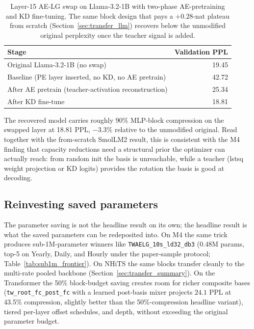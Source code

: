\documentclass[11pt,a4paper]{article}
\begin{document}
\begin{table}[h]
  \caption{Layer-15 AE-LG swap on Llama-3.2-1B with two-phase AE-pretraining and KD fine-tuning. The same block design that pays a $+0.28$-nat plateau from scratch (Section~\ref{sec:transfer_llm}) recovers below the unmodified original perplexity once the teacher signal is added.}
  \label{tab:llm_kd}
  \centering
  \begin{tabular}{lr}
    \toprule
    Stage & Validation PPL \\
    \midrule
    Original Llama-3.2-1B (no swap)                 & 19.45 \\
    Baseline (PE layer inserted, no KD, no AE pretrain) & 42.72 \\
    After AE pretrain (teacher-activation reconstruction) & 25.34 \\
    After KD fine-tune                              & 18.81 \\
    \bottomrule
  \end{tabular}
\end{table}

The recovered model carries roughly 90\% MLP-block compression on the swapped layer at 18.81 PPL, $-3.3\%$ relative to the unmodified original. Read together with the from-scratch SmolLM2 result, this is consistent with the M4 finding that capacity reductions need a structural prior the optimizer can actually reach: from random init the basis is unreachable, while a teacher (lstsq weight projection or KD logits) provides the rotation the basis is good at decoding.

\subsection{Reinvesting saved parameters}

The parameter saving is not the headline result on its own; the headline result is what the saved parameters can be redeposited into. On M4 the same trick produces sub-1M-parameter winners like \texttt{TWAELG\_10s\_ld32\_db3} (0.48M params, top-5 on Yearly, Daily, and Hourly under the paper-sample protocol; Table~\ref{tab:sub1m_frontier}). On NHiTS the same blocks transfer cleanly to the multi-rate pooled backbone (Section~\ref{sec:transfer_summary}). On the Transformer the 50\% block-budget saving creates room for richer composite bases (\texttt{tw\_root\_fc\_post\_fc} with a learned post-basis mixer projects $24.1$ PPL at 43.5\% compression, slightly better than the 50\%-compression headline variant), tiered per-layer offset schedules, and depth, without exceeding the original parameter budget.
\end{document}
